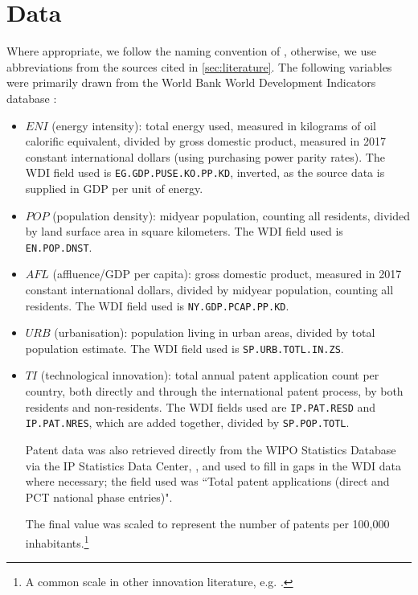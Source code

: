 \documentclass[12pt,a4paper]{article}
\begin{document}
\section{Data}\label{sec:data}
Where appropriate, we follow the naming convention of \cite{rafiqUrbanizationOpennessEmissions2016}, otherwise, we use abbreviations from the sources cited in \cref{sec:literature}.
The following variables were primarily drawn from the World Bank World Development Indicators database \citep{theworldbankWorldDevelopmentIndicators2019}:
\begin{itemize}
\item $ENI$ (energy intensity): total energy used, measured in kilograms of oil calorific equivalent, divided by gross domestic product, measured in 2017 constant international dollars (using purchasing power parity rates).
The WDI field used is \texttt{EG.GDP.PUSE.KO.PP.KD}, inverted, as the source data is supplied in GDP per unit of energy.
\item $POP$ (population density): midyear population, counting all residents, divided by land surface area in square kilometers. The WDI field used is \texttt{EN.POP.DNST}.
\item $AFL$ (affluence/GDP per capita): gross domestic product, measured in 2017 constant international dollars, divided by midyear population, counting all residents. The WDI field used is \texttt{NY.GDP.PCAP.PP.KD}.
\item $URB$ (urbanisation): population living in urban areas, divided by total population estimate. The WDI field used is \texttt{SP.URB.TOTL.IN.ZS}.
\item $TI$ (technological innovation): total annual patent application count per country, both directly and through the international patent process, by both residents and non-residents. The WDI fields used are \texttt{IP.PAT.RESD} and \texttt{IP.PAT.NRES}, which are added together, divided by \texttt{SP.POP.TOTL}.

Patent data was also retrieved directly from the WIPO Statistics Database via the IP Statistics Data Center, \cite{wipoWIPOStatisticsDatabase2020}, and used to fill in gaps in the WDI data where necessary; the field used was ``Total patent applications (direct and PCT national phase entries)".

The final value was scaled to represent the number of patents per 100,000 inhabitants.\footnote{A common scale in other innovation literature, e.g. \cite{ocampo-corralesKnowledgeFlowsTechnologies2020}.}
 
\end{itemize}
\end{document}
